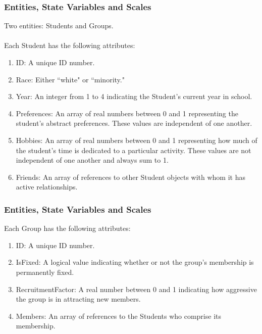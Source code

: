 \documentclass{beamer}
\begin{document}
%
%


\begin{frame}
\frametitle{Entities, State Variables and Scales}
Two entities: Students and Groups.\\

~~\\

Each Student has the following attributes:
\begin{enumerate}
\item ID: A unique ID number.
\item Race: Either ``white" or ``minority."
\item Year: An integer from 1 to 4 indicating the Student's current year in school.
\item Preferences: An array of real numbers between 0 and 1 representing the student's abstract preferences. These values are independent of one another.
\item Hobbies: An array of real numbers between 0 and 1 representing how much of the student's time is dedicated to a particular activity. These values are not independent of one another and always sum to 1.
\item Friends: An array of references to other Student objects with whom it has active relationships.
\end{enumerate}
\end{frame}


\begin{frame}
\frametitle{Entities, State Variables and Scales}
Each Group has the following attributes:
\begin{enumerate}
\item ID: A unique ID number.
\item IsFixed: A logical value indicating whether or not the group's membership is permanently fixed.
\item RecruitmentFactor: A real number between 0 and 1 indicating how aggressive the group is in attracting new members.
\item Members: An array of references to the Students who comprise its membership.
\end{enumerate}
\end{frame}
\end{document}

